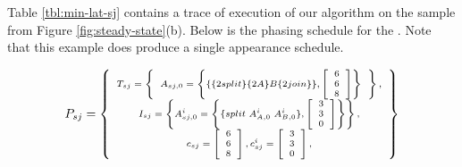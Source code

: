 Table \ref{tbl:min-lat-sj} contains a trace of execution of our
algorithm on the sample {\splitjoin} from Figure
\ref{fig:steady-state}(b). Below is the phasing schedule for the
{\splitjoin}. Note that this example does produce a single
appearance schedule.

\begin{displaymath} \scriptsize
P_{sj} = \left\{
\begin{array}{c}
T_{sj} = \left\{
\begin{array}{c}
A_{sj,0} = \left\{ \{\{2 split\}\{2A\}B\{2 join\}\}, \left[\begin{array}{c} 6 \\ 6 \\ 8 \end{array}\right]\right\} \\
\end{array}\right\}, \\
I_{sj} = \left\{ A^i_{sj,0} = \left\{
\{split\ A^i_{A,0}\ A^i_{B,0}\}, \left[\begin{array}{c} 3 \\ 3 \\ 0 \\
\end{array}\right]\right\}
\right\}, \\
c_{sj} = \left[ \begin{array}{c} 6 \\ 6 \\ 8 \end{array} \right],
c^i_{sj} = \left[ \begin{array}{c} 3 \\ 3 \\ 0 \end{array}
\right],
\end{array}
\right\}
\end{displaymath}
